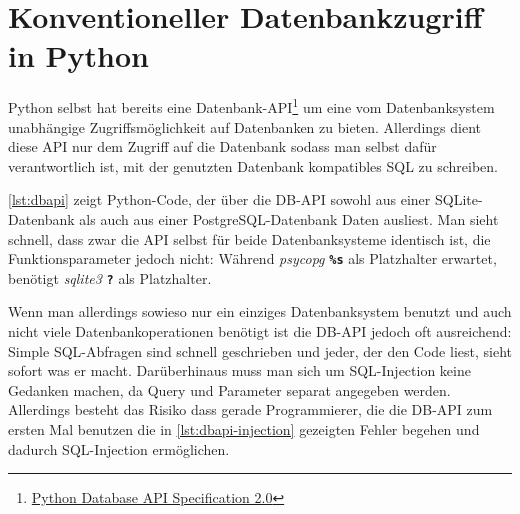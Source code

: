 \section{Konventioneller Datenbankzugriff in Python}

Python selbst hat bereits eine
Datenbank-API\footnote{\href{http://www.python.org/dev/peps/pep-0249/}{Python
Database API Specification 2.0}} um eine vom Datenbanksystem unabhängige
Zugriffsmöglichkeit auf Datenbanken zu bieten.
Allerdings dient diese API nur dem Zugriff auf die Datenbank sodass man selbst
dafür verantwortlich ist, mit der genutzten Datenbank kompatibles SQL zu
schreiben.

\autoref{lst:dbapi} zeigt Python-Code, der über die DB-API sowohl aus
einer SQLite-Datenbank als auch aus einer PostgreSQL-Datenbank Daten ausliest.
Man sieht schnell, dass zwar die API selbst für beide Datenbanksysteme identisch
ist, die Funktionsparameter jedoch nicht: Während \emph{psycopg}
\textbf{\texttt{\%s}} als Platzhalter erwartet, benötigt \emph{sqlite3}
\textbf{\texttt{?}} als Platzhalter.



Wenn man allerdings sowieso nur ein einziges Datenbanksystem benutzt und auch
nicht viele Datenbankoperationen benötigt ist die DB-API jedoch oft ausreichend:
Simple SQL-Abfragen sind schnell geschrieben und jeder, der den Code liest,
sieht sofort was er macht. Darüberhinaus muss man sich um SQL-Injection keine
Gedanken machen, da Query und Parameter separat angegeben werden. Allerdings
besteht das Risiko dass gerade Programmierer, die die DB-API zum ersten Mal
benutzen die in \autoref{lst:dbapi-injection} gezeigten Fehler begehen und
dadurch SQL-Injection ermöglichen.


